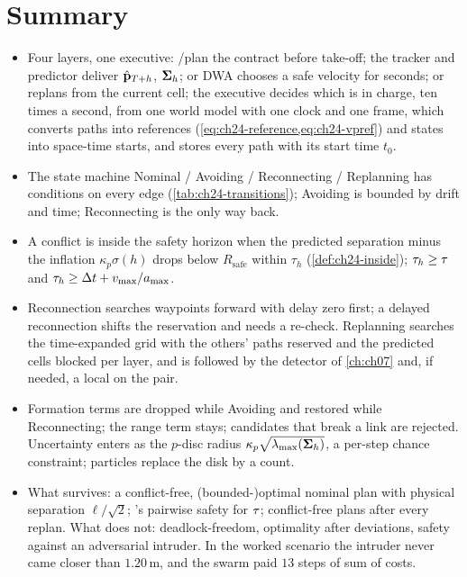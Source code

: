 \section{Summary}
\begin{summary}
\begin{itemize}
  \item Four layers, one executive: \cbs/\ecbs plan the contract before
  take-off; the tracker and predictor deliver $\hat{\mathbf{p}}_{T+h}$,
  $\mathbf{\Sigma}_h$; \orca or DWA chooses a safe velocity for seconds;
  \dstarlite or \astar replans from the current cell; the executive decides
  which is in charge, ten times a second, from one world model with one
  clock and one frame, which converts paths into references
  (\cref{eq:ch24-reference,eq:ch24-vpref}) and states into space-time
  starts, and stores every path with its start time $t_0$.
  \item The state machine Nominal / Avoiding / Reconnecting / Replanning
  has conditions on every edge (\cref{tab:ch24-transitions}); Avoiding is
  bounded by drift and time; Reconnecting is the only way back.
  \item A conflict is inside the safety horizon when the predicted
  separation minus the inflation $\kappa_p\sigma(h)$ drops below
  $R_{\mathrm{safe}}$ within $\tau_h$ (\cref{def:ch24-inside});
  $\tau_h \ge \tau$ and $\tau_h \ge \Delta t + v_{\max}/a_{\max}$.
  \item Reconnection searches waypoints forward with delay zero first; a
  delayed reconnection shifts the reservation and needs a re-check.
  Replanning searches the time-expanded grid with the others' paths reserved
  and the predicted cells blocked per layer, and is followed by the detector
  of \cref{ch:ch07} and, if needed, a local \cbs on the pair.
  \item Formation terms are dropped while Avoiding and restored while
  Reconnecting; the range term stays; candidates that break a link are
  rejected. Uncertainty enters as the $p$-disc radius
  $\kappa_p\sqrt{\lambda_{\max}(\mathbf{\Sigma}_h)}$, a per-step chance
  constraint; particles replace the disk by a count.
  \item What survives: a conflict-free, (bounded-)optimal nominal plan with
  physical separation $\ell/\sqrt2$; \orca's pairwise safety for $\tau$;
  conflict-free plans after every replan. What does not: deadlock-freedom,
  optimality after deviations, safety against an adversarial intruder. In
  the worked scenario the intruder never came closer than $1.20$\,m, and
  the swarm paid $13$ steps of sum of costs.
\end{itemize}
\end{summary}

